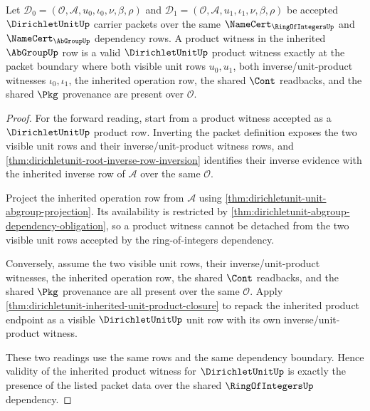 \begin{theorem}
\label{thm:dirichletunit-root-product-witness-inversion}
Let $\mathcal{D}_0=(\mathcal{O},\mathcal{A},u_0,\iota_0,\nu,\beta,\rho)$ and $\mathcal{D}_1=(\mathcal{O},\mathcal{A},u_1,\iota_1,\nu,\beta,\rho)$ be accepted $\DirichletUnitUp$ carrier packets over the same $\NameCert_{\RingOfIntegersUp}$ and $\NameCert_{\AbGroupUp}$ dependency rows. A product witness in the inherited $\AbGroupUp$ row is a valid $\DirichletUnitUp$ product witness exactly at the packet boundary where both visible unit rows $u_0,u_1$, both inverse/unit-product witnesses $\iota_0,\iota_1$, the inherited operation row, the shared $\Cont$ readbacks, and the shared $\Pkg$ provenance are present over $\mathcal{O}$.
\end{theorem}
\begin{proof}
For the forward reading, start from a product witness accepted as a $\DirichletUnitUp$ product row. Inverting the packet definition exposes the two visible unit rows and their inverse/unit-product witness rows, and \autoref{thm:dirichletunit-root-inverse-row-inversion} identifies their inverse evidence with the inherited inverse row of $\mathcal{A}$ over the same $\mathcal{O}$.

Project the inherited operation row from $\mathcal{A}$ using \autoref{thm:dirichletunit-unit-abgroup-projection}. Its availability is restricted by \autoref{thm:dirichletunit-abgroup-dependency-obligation}, so a product witness cannot be detached from the two visible unit rows accepted by the ring-of-integers dependency.

Conversely, assume the two visible unit rows, their inverse/unit-product witnesses, the inherited operation row, the shared $\Cont$ readbacks, and the shared $\Pkg$ provenance are all present over the same $\mathcal{O}$. Apply \autoref{thm:dirichletunit-inherited-unit-product-closure} to repack the inherited product endpoint as a visible $\DirichletUnitUp$ unit row with its own inverse/unit-product witness.

These two readings use the same rows and the same dependency boundary. Hence validity of the inherited product witness for $\DirichletUnitUp$ is exactly the presence of the listed packet data over the shared $\RingOfIntegersUp$ dependency.
\end{proof}

